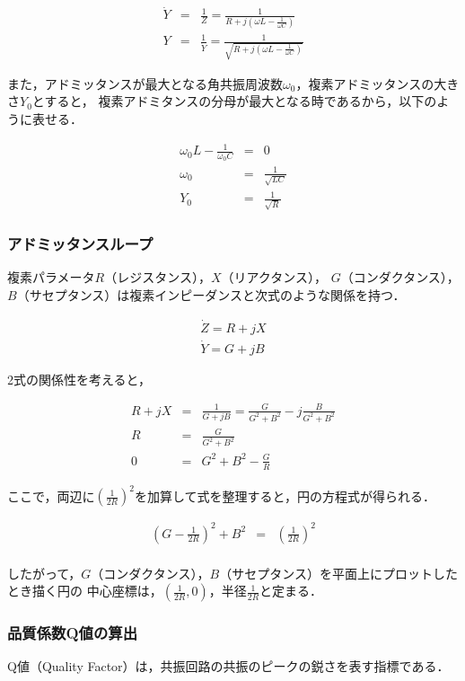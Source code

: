 \documentclass[dvipdfmx,titlepage,a4j]{jsarticle}  %
\numberwithin{equation}{section}
\begin{document}
\begin{eqnarray}
  \dot{Y} &=& \frac{1}{Z} = \frac{1}{R + j(\omega L - \frac{1}{\omega C})} \\
  Y &=& \frac{1}{\dot{Y}} = \frac{1}{\sqrt{R + j(\omega L - \frac{1}{\omega C})}}
\end{eqnarray}

また，アドミッタンスが最大となる角共振周波数$\omega_0$，複素アドミッタンスの大きさ$Y_0$とすると，
複素アドミタンスの分母が最大となる時であるから，以下のように表せる．

\begin{eqnarray}
  \omega_0 L - \frac{1}{\omega_0 C} &=& 0 \\
  \omega_0 &=& \frac{1}{\sqrt{LC}} \\
  Y_0 &=& \frac{1}{\sqrt{R}}
\end{eqnarray}

\subsubsection{アドミッタンスループ}

複素パラメータ$R$（レジスタンス），$X$（リアクタンス），
$G$（コンダクタンス），$B$（サセプタンス）は複素インピーダンスと次式のような関係を持つ．

\begin{eqnarray}
  \dot{Z} = R + jX \\
  \dot{Y} = G + jB
\end{eqnarray}

2式の関係性を考えると，

\begin{eqnarray}
  R + jX &=& \frac{1}{G + jB} = \frac{G}{G^2 + B^2} -j\frac{B}{G^2 + B^2} \\
  R &=& \frac{G}{G^2 + B^2} \\
  0 &=& G^2 + B^2 - \frac{G}{R}
\end{eqnarray}

ここで，両辺に$(\frac{1}{2R})^2$を加算して式を整理すると，円の方程式が得られる．

\begin{eqnarray}
  (G - \frac{1}{2R})^2 + B^2 &=& (\frac{1}{2R})^2 \\
\end{eqnarray}

したがって，$G$（コンダクタンス），$B$（サセプタンス）を平面上にプロットしたとき描く円の
中心座標は，$(\frac{1}{2R}, 0)$，半径$\frac{1}{2R}$と定まる．

\subsubsection{品質係数Q値の算出}
Q値（Quality Factor）は，共振回路の共振のピークの鋭さを表す指標である．
\end{document}
